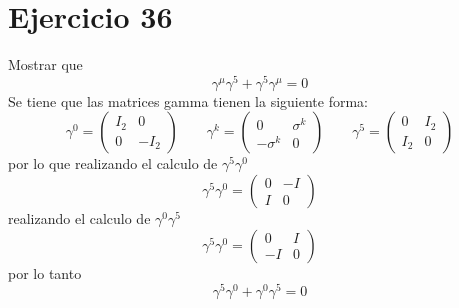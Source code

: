 \section*{Ejercicio 36}
Mostrar que
\begin{equation*}
    \gamma^\mu \gamma^5 + \gamma^5 \gamma^\mu  =0
\end{equation*}
Se tiene que las matrices gamma tienen la siguiente forma: 
\begin{equation*}
    \gamma^0 = \left(\begin{matrix}
        I_2 & 0\\ 0 & -I_2  
    \end{matrix}\right) \qquad
    \gamma^k = \left(\begin{matrix}
         0 & \sigma^k \\  -\sigma^k  & 0
    \end{matrix}\right) \qquad
    \gamma^5 = \left(\begin{matrix}
         0 & I_2\\ I_2  & 0
    \end{matrix}\right)
\end{equation*}
por lo que realizando el calculo de $\gamma^5 \gamma^0$ 
\begin{equation*}
    \gamma^5 \gamma^0 =\left(\begin{matrix}
        0 & -I \\ I & 0
    \end{matrix}\right)
\end{equation*}
realizando el calculo de $\gamma^0 \gamma^5$  
\begin{equation*}
    \gamma^5 \gamma^0 =\left(\begin{matrix}
        0 & I \\ -I & 0
    \end{matrix}\right)
\end{equation*}
por lo tanto
\begin{equation*}
    \gamma^5 \gamma^0 + \gamma^0 \gamma^5 = 0
\end{equation*}
